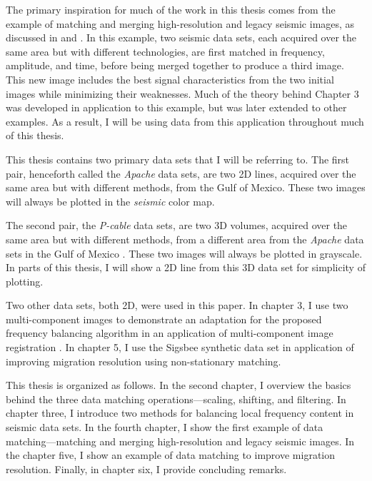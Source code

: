 The primary inspiration for much of the work in this thesis comes from the example of matching and merging high-resolution and legacy seismic images, as discussed in \cite{merge2} and \cite{merge}.
In this example, two seismic data sets, each acquired over the same area but with different technologies, are first matched in frequency, amplitude, and time, before being merged together to produce a third image.
This new image includes the best signal characteristics from the two initial images while minimizing their weaknesses.
Much of the theory behind Chapter 3 was developed in application to this example, but was later extended to other examples.
As a result, I will be using data from this application throughout much of this thesis.

This thesis contains two primary data sets that I will be referring to. 
The first pair, henceforth called the {\it Apache} data sets, are two 2D lines, acquired over the same area but with different methods, from the Gulf of Mexico. 
These two images will always be plotted in the {\em seismic} color map.

The second pair, the {\em P-cable} data sets, are two 3D volumes, acquired over the same area but with different methods, from a different area from the {\em Apache} data sets in the Gulf of Mexico \cite[]{pcable,data}.
These two images will always be plotted in grayscale.
In parts of this thesis, I will show a 2D line from this 3D data set for simplicity of plotting.

Two other data sets, both 2D, were used in this paper. 
In chapter 3, I use two multi-component images to demonstrate an adaptation for the proposed frequency balancing algorithm in an application of multi-component image registration \cite[]{attr}.
In chapter 5, I use the Sigsbee synthetic data set \cite[]{sigsbee} in application of improving migration resolution using non-stationary matching.

This thesis is organized as follows.
In the second chapter, I overview the basics behind the three data matching operations---scaling, shifting, and filtering.
In chapter three, I introduce two methods for balancing local frequency content in seismic data sets.
In the fourth chapter, I show the first example of data matching---matching and merging high-resolution and legacy seismic images.
In the chapter five, I show an example of data matching to improve migration resolution.
Finally, in chapter six, I provide concluding remarks.

